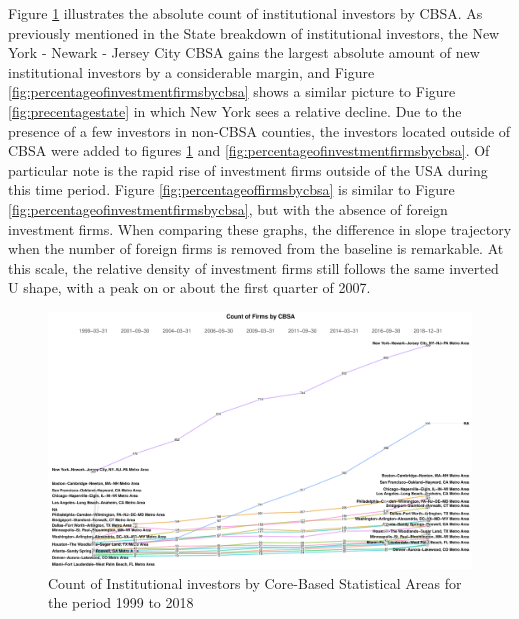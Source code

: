 Figure \ref{fig:countbycbsalegal} illustrates the absolute count of institutional investors by CBSA.  As previously mentioned in the State breakdown of institutional investors, the New York - Newark - Jersey City CBSA gains the largest absolute amount of new institutional investors by a considerable margin, and Figure \ref{fig:percentageofinvestmentfirmsbycbsa} shows a similar picture to Figure \ref{fig:precentagestate} in which New York sees a relative decline.  Due to the presence of a few investors in non-CBSA counties, the investors located outside of CBSA were added to figures \ref{fig:countbycbsalegal} and \ref{fig:percentageofinvestmentfirmsbycbsa}.  Of particular note is the rapid rise of investment firms outside of the USA during this time period.  Figure \ref{fig:percentageoffirmsbycbsa} is similar to Figure \ref{fig:percentageofinvestmentfirmsbycbsa}, but with the absence of foreign investment firms. When comparing these graphs, the difference in slope trajectory when the number of foreign firms is removed from the baseline is remarkable.   At this scale, the relative density of investment firms still follows the same inverted U shape, with a peak on or about the first quarter of 2007.  

\begin{figure}[h]
	\centering
	\includegraphics[width=1\linewidth]{Figures/ChapterIII/Count_by_CBSA_Legal}
	\caption[Count of Institutional investors by CBSA]{Count of Institutional investors by Core-Based Statistical Areas for the period 1999 to 2018}
	\label{fig:countbycbsalegal}
\end{figure}


